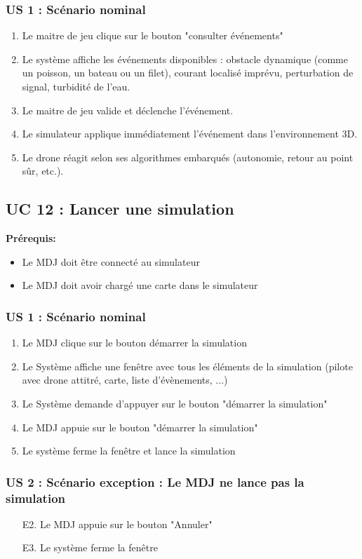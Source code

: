\documentclass{scrartcl}
\begin{document}
\subsubsection*{US 1 : Scénario nominal}
\begin{enumerate}
    \item Le maitre de jeu clique sur le bouton "consulter événements"
    \item Le système affiche les événements disponibles : obstacle dynamique (comme un poisson, un bateau ou un filet), courant localisé imprévu, perturbation de signal, turbidité de l’eau.
    \item Le maitre de jeu valide et déclenche l’événement.
    \item Le simulateur applique immédiatement l’événement dans l’environnement 3D.
    \item Le drone réagit selon ses algorithmes embarqués (autonomie, retour au point sûr, etc.).
\end{enumerate}

\subsection{UC 12 : Lancer une simulation}
\textbf{Prérequis:}
\begin{itemize}
    \item Le MDJ doit être connecté au simulateur
    \item Le MDJ doit avoir chargé une carte dans le simulateur
\end{itemize}

\subsubsection*{US 1 : Scénario nominal}
\begin{enumerate}
    \item Le MDJ clique sur le bouton démarrer la simulation
    \item Le Système affiche une fenêtre avec tous les éléments de la simulation (pilote avec drone attitré, carte, liste d'évènements, ...)
    \item Le Système demande d'appuyer sur le bouton "démarrer la simulation"
    \item Le MDJ appuie sur le bouton "démarrer la simulation"
    \item Le système ferme la fenêtre et lance la simulation
\end{enumerate}

\subsubsection*{US 2 : Scénario exception : Le MDJ ne lance pas la simulation}
\begin{enumerate}
    \item[E2.] Le MDJ appuie sur le bouton "Annuler"
    \item[E3.] Le système ferme la fenêtre
\end{enumerate}
\end{document}
